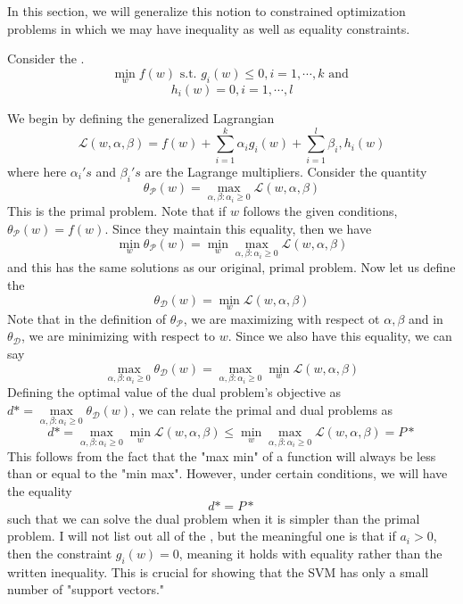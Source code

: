 \documentclass[12pt]{scrartcl}
\begin{document}
In this section, we will generalize this notion to constrained optimization
problems in which we may have inequality as well as equality constraints.
\begin{example}
    Consider the .
    \[\min_w f(w) \text{ s.t. } g_i(w) \leq 0, i = 1, \cdots, k \text{ and }\]
    \[h_i(w) = 0, i = 1, \cdots, l\]

    We begin by defining the generalized Lagrangian
    \[\mathcal{L}(w, \alpha, \beta) = f(w) + \sum_{i=1}^k \alpha_ig_i(w) + \sum_{i=1}^l \beta_i, h_i(w)\]
    where here $\alpha_i's$ and $\beta_i's$ are the Lagrange multipliers. Consider
    the quantity
    \[\theta_{\mathcal{P}}(w) = \underset{\alpha, \beta: \alpha_i \geq 0}{\max}\mathcal{L}(w, \alpha, \beta)\]
    This is the primal problem. Note that if $w$ follows the given conditions,
    $\theta_{\mathcal{P}}(w) = f(w)$. Since they maintain this equality, then we
    have
    \[\underset{w}{\min}\theta_{\mathcal{P}}(w) = \underset{w}{\min}\underset{\alpha, \beta: \alpha_i \geq 0}{\max}\mathcal{L}(w, \alpha, \beta)\] and this has the same solutions as our original, primal problem. Now let us
    define the 
    \[\theta_{\mathcal{D}}(w) = \underset{w}{\min}\mathcal{L}(w, \alpha, \beta)\]
    Note that in the definition of $\theta_{\mathcal{P}}$, we are maximizing with
    respect ot $\alpha, \beta$ and in $\theta_{\mathcal{D}}$, we are minimizing
    with respect to $w$. Since we also have this equality, we can say
    \[\underset{\alpha, \beta: \alpha_i \geq 0}{\max}\theta_{\mathcal{D}}(w) = \underset{\alpha, \beta: \alpha_i \geq 0 }{\max}\underset{w}{\min}\mathcal{L}(w, \alpha, \beta)\]
    Defining the optimal value of the dual problem's objective as $d* =
        \underset{\alpha, \beta: \alpha_i \geq 0}{\max}\theta_{\mathcal{D}}(w)$, we can
    relate the primal and dual problems as
    \[d* = \underset{\alpha, \beta: \alpha_i \geq 0}{\max}\underset{w}{\min}\mathcal{L}(w, \alpha, \beta) \leq \underset{w}{\min}\underset{\alpha, \beta: \alpha_i \geq 0}{\max}\mathcal{L}(w, \alpha, \beta) = P*\]
    This follows from the fact that the "max min" of a function will always be less
    than or equal to the "min max". However, under certain conditions, we will have
    the equality
    \[d* = P*\]
    such that we can solve the dual problem when it is simpler than the primal
    problem. I will not list out all of the , but the meaningful one is that if $a_i > 0$, then the constraint
    $g_i(w) = 0$, meaning it holds with equality rather than the written
    inequality. This is crucial for showing that the SVM has only a small number of
    "support vectors."
\end{example}
\end{document}
